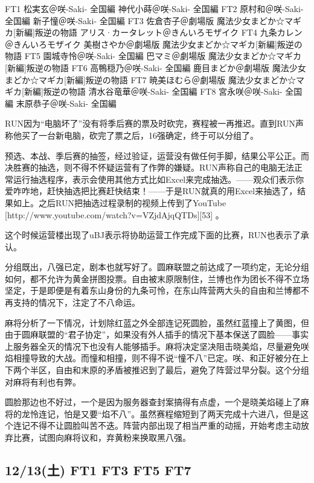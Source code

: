     FT1 松実玄＠咲-Saki- 全国編 神代小蒔＠咲-Saki- 全国編
    FT2 原村和＠咲-Saki- 全国編  新子憧＠咲-Saki- 全国編
    FT3 佐倉杏子＠劇場版 魔法少女まどか☆マギカ[新編]叛逆の物語  アリス·カータレット＠きんいろモザイク
    FT4 九条カレン＠きんいろモザイク  美樹さやか＠劇場版 魔法少女まどか☆マギカ[新編]叛逆の物語
    FT5 園城寺怜＠咲-Saki- 全国編  巴マミ＠劇場版 魔法少女まどか☆マギカ[新編]叛逆の物語
    FT6 高鴨穏乃＠咲-Saki- 全国編  鹿目まどか＠劇場版 魔法少女まどか☆マギカ[新編]叛逆の物語
    FT7 暁美ほむら＠劇場版 魔法少女まどか☆マギカ[新編]叛逆の物語  清水谷竜華＠咲-Saki- 全国編
    FT8 宮永咲＠咲-Saki- 全国編  末原恭子＠咲-Saki- 全国編

RUN因为“电脑坏了”没有将季后赛的票及时砍完，赛程被一再推迟。直到RUN声称他买了一台新电脑，砍完了票之后，16强确定，终于可以分组了。

预选、本战、季后赛的抽签，经过验证，运营没有做任何手脚，结果公平公正。而决胜赛的抽选，则不得不怀疑运营有了作弊的嫌疑。RUN声称自己的电脑无法正常运行抽选程序，表示会使用其他方式比如Excel来完成抽选。——观众们表示你爱咋咋地，赶快抽选把比赛赶快结束！——于是RUN就真的用Excel来抽选了，结果如上。之后RUN把抽选过程录制的视频上传到了YouTube [http://www.youtube.com/watch?v=VZjdAjqQTDs][53] 。

这个时候运营楼出现了uBJ表示将协助运营工作完成下面的比赛，RUN也表示了承认。

分组既出，八强已定，剧本也就写好了。圆麻联盟之前达成了一项约定，无论分组如何，都不允许为黄金拼图投票。自由被末原限制住，兰博也作为团长不得不立场坚定，于是即便是有着东山身份的九条可怜，在东山阵营两大头的自由和兰博都不再支持的情况下，注定了不八命运。

麻将分析了一下情况，计划除红蓝之外全部连记死圆脸，虽然红蓝撞上了黄图，但由于圆麻联盟的“君子协定”，如果没有外人插手的情况下基本保送了圆脸——事实上服务器全灭的情况下也没有人能够插手。麻将决定坚决阻击晓美焰，尽量避免咲焰相撞导致的大战。而憧和相撞，则不得不说“憧不八”已定。咲、和正好被分在上下两个半区，自由和末原的矛盾被推迟到了最后，避免了阵营过早分裂。这个分组对麻将有利也有弊。

圆脸那边也不好过，一个是因为服务器查封案搞得有点虚，一个是晓美焰碰上了麻将的龙怜连记，怕是又要“焰不八”。虽然赛程缩短到了两天完成十六进八，但是这个连记不得不让圆脸叫苦不迭。阵营内部出现了相当严重的动摇，开始考虑主动放弃比赛，试图向麻将议和，弃黄粉来换取黑八强。

\subsection{12/13(土) FT1 FT3 FT5 FT7}

